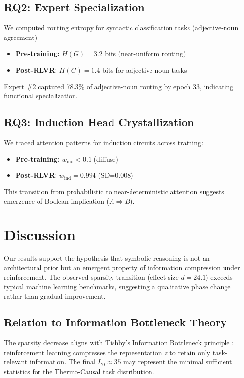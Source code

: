 \documentclass[12pt, a4paper]{article}
\begin{document}
\subsection{RQ2: Expert Specialization}
We computed routing entropy for syntactic classification tasks (adjective-noun agreement).

\begin{itemize}
    \item \textbf{Pre-training:} $H(G) = 3.2$ bits (near-uniform routing)
    \item \textbf{Post-RLVR:} $H(G) = 0.4$ bits for adjective-noun tasks
\end{itemize}

Expert \#2 captured 78.3\% of adjective-noun routing by epoch 33, indicating functional specialization.

\subsection{RQ3: Induction Head Crystallization}
We traced attention patterns for induction circuits across training:

\begin{itemize}
    \item \textbf{Pre-training:} $w_{\mathrm{ind}} < 0.1$ (diffuse)
    \item \textbf{Post-RLVR:} $w_{\mathrm{ind}} = 0.994$ (SD=0.008)
\end{itemize}

This transition from probabilistic to near-deterministic attention suggests emergence of Boolean implication ($A \Rightarrow B$).

\section{Discussion}
Our results support the hypothesis that symbolic reasoning is not an architectural prior but an emergent property of information compression under reinforcement. The observed sparsity transition (effect size $d=24.1$) exceeds typical machine learning benchmarks, suggesting a qualitative phase change rather than gradual improvement.

\subsection{Relation to Information Bottleneck Theory}
The sparsity decrease aligns with Tishby's Information Bottleneck principle \cite{Tishby2015IB}: reinforcement learning compresses the representation $z$ to retain only task-relevant information. The final $L_0 \approx 35$ may represent the minimal sufficient statistics for the Thermo-Causal task distribution.
\end{document}
